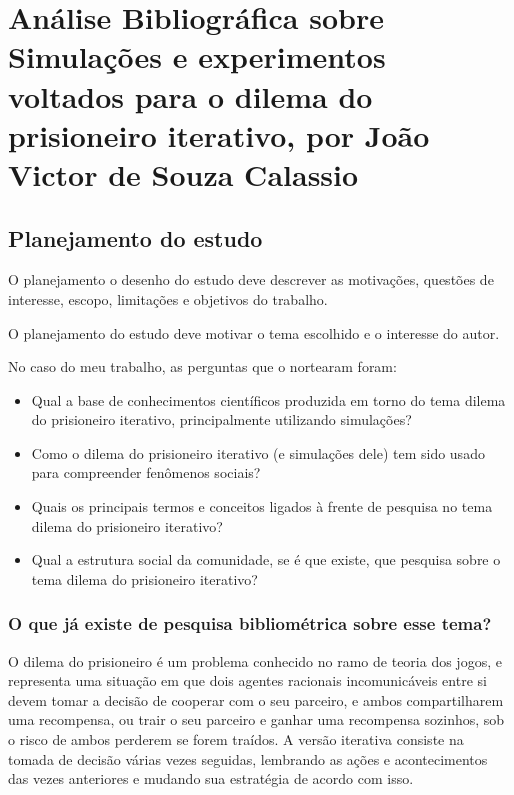 \chapter{Análise Bibliográfica sobre Simulações e experimentos voltados para o dilema do prisioneiro iterativo, por João Victor de Souza Calassio\label{chap:bibliometria:jhcf}}

\section{Planejamento do estudo\label{PD@jvcalassio:questoes}}
O planejamento o  desenho do estudo deve descrever as motivações, questões de interesse, escopo, limitações e objetivos do trabalho.

O planejamento do estudo deve motivar o tema escolhido e o interesse do autor.

No caso do meu trabalho, as perguntas que o nortearam foram:
\begin{itemize}
    \item Qual a base de conhecimentos científicos produzida em torno do tema dilema do prisioneiro iterativo, principalmente utilizando simulações? 
    \item Como o dilema do prisioneiro iterativo (e simulações dele) tem sido usado para compreender fenômenos sociais? 
    \item Quais os principais termos e conceitos ligados à frente de pesquisa no tema dilema do prisioneiro iterativo? 
    \item Qual a estrutura social da comunidade, se é que existe, que pesquisa sobre o tema dilema do prisioneiro iterativo?
\end{itemize}

\subsection{O que já existe de pesquisa bibliométrica sobre esse tema?}

O dilema do prisioneiro \cite{noauthor_prisoners_nodate} é um problema conhecido no ramo de teoria dos jogos, e representa uma situação em que dois agentes racionais incomunicáveis entre si devem tomar a decisão de cooperar com o seu parceiro, e ambos compartilharem uma recompensa, ou trair o seu parceiro e ganhar uma recompensa sozinhos, sob o risco de ambos perderem se forem traídos. A versão iterativa consiste na tomada de decisão várias vezes seguidas, lembrando as ações e acontecimentos das vezes anteriores e mudando sua estratégia de acordo com isso.

